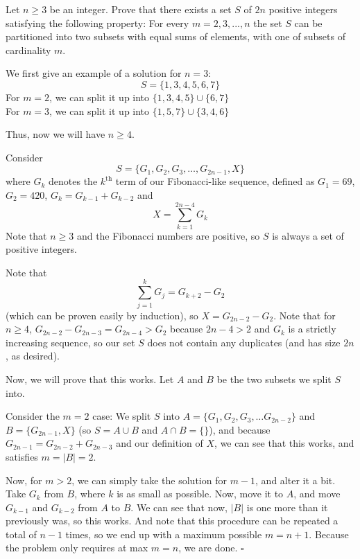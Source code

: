 
\begin{problem}[ISL 2018 C1]
    Let $n\geqslant 3$ be an integer. Prove that there exists a set $S$ of $2n$ positive integers satisfying the following property: For every $m=2,3,...,n$ the set $S$ can be partitioned into two subsets with equal sums of elements, with one of subsets of cardinality $m$.
\end{problem}

\begin{solution}
    We first give an example of a solution for $n=3$:
    \[S = \{1, 3, 4, 5, 6, 7\}\]
    For $m=2$, we can split it up into $\{1,3,4,5\} \cup \{6,7\}$\\
    For $m=3$, we can split it up into $\{1,5,7\} \cup \{3,4,6\}$
    
    Thus, now we will have $n \geq 4$.
    
    Consider \[S = \{G_1, G_2, G_3, \ldots, G_{2n-1}, X\}\] where $G_k$ denotes the $k^\textrm{th}$ term of our Fibonacci-like sequence, defined as $G_1 = 69$, $G_2 = 420$, $G_k = G_{k-1} + G_{k-2}$ and \[X = \sum_{k=1}^{2n-4} G_k\] Note that $n \geq 3$ and the Fibonacci numbers are positive, so $S$ is always a set of positive integers.
    
    Note that \[\sum_{j=1}^k G_j = G_{k+2} - G_2\] (which can be proven easily by induction), so $X = G_{2n-2} - G_2$. Note that for $n \geq 4$, $G_{2n-2} - G_{2n-3} = G_{2n-4} > G_2$ because $2n-4 > 2$ and $G_k$ is a strictly increasing sequence, so our set $S$ does not contain any duplicates (and has size $2n$, as desired).
    
    Now, we will prove that this works. Let $A$ and $B$ be the two subsets we split $S$ into.
    
    Consider the $m=2$ case: We split $S$ into $A = \{G_1, G_2, G_3, \ldots G_{2n-2}\} $ and $B = \{G_{2n-1}, X\}$ (so $S = A \cup B$ and $A \cap B = \{\}$), and because $G_{2n-1} = G_{2n-2} + G_{2n-3}$ and our definition of $X$, we can see that this works, and satisfies $m = |B| = 2$.
    
    Now, for $m > 2$, we can simply take the solution for $m-1$, and alter it a bit. Take $G_k$ from $B$, where $k$ is as small as possible. Now, move it to $A$, and move $G_{k-1}$ and $G_{k-2}$ from $A$ to $B$. We can see that now, $|B|$ is one more than it previously was, so this works. And note that this procedure can be repeated a total of $n-1$ times, so we end up with a maximum possible $m=n+1$. Because the problem only requires at max $m=n$, we are done. $\square$
\end{solution}
